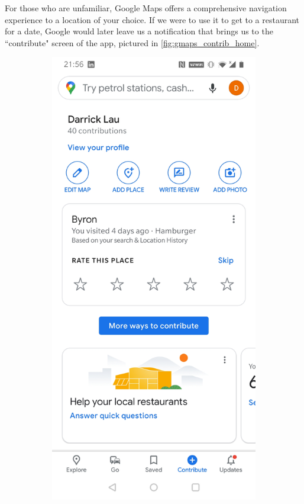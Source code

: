 For those who are unfamiliar, Google Maps offers a comprehensive navigation experience to a location of your choice. If we were to use it to get to a restaurant for a date, Google would later leave us a notification that brings us to the ``contribute" screen of the app, pictured in \ref{fig:gmaps_contrib_home}.

\begin{figure}[htb!]
    \begin{center}
        \begin{subfigure}{.3\textwidth}
            \centering
            \includegraphics[width=0.8\linewidth]{images/gmaps_contribute.jpg}

\end{subfigure}
\end{center}
\end{figure}
